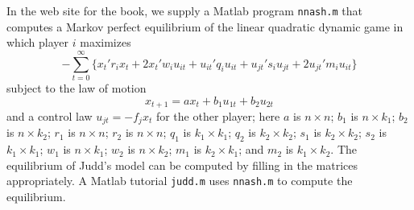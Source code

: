 In the web site for the book,
we supply a Matlab program {\tt nnash.m} that
computes a Markov perfect equilibrium of
the linear quadratic dynamic game
in which player $i$ maximizes
$$ - \sum_{t=0}^\infty \{ x_t' r_i x_t + 2 x_t' w_i u_{it} +u_{it}' q_i
  u_{it} + u_{jt}' s_i u_{jt} + 2 u_{jt}' m_i u_{it} \}$$
subject to the law of motion
$$x_{t+1} = a x_t + b_1 u_{1t}+b_2 u_{2t}$$
and a control law $u_{jt}= -f_j x_t$ for the other player; here
$a$ is $n \times n$; $b_1$ is $n \times k_1$; $b_2$ is $n \times k_2$;
$r_1$ is $n\times n$; $r_2$ is $ n \times n$;
$q_1$ is $k_1 \times k_1$; $q_2$ is $k_2 \times k_2$;
$s_1$ is $k_2 \times k_2$; $s_2$ is $k_1 \times k_1$;
$w_1$ is  $n \times k_1$;
$w_2$ is $n \times k_2$;
$m_1$ is $ k_2 \times k_1$; and  $m_2$ is $k_1 \times k_2$.
The equilibrium of Judd's model can be computed by
filling in the matrices appropriately.  A Matlab tutorial
{\tt judd.m} uses {\tt nnash.m} to compute the equilibrium.